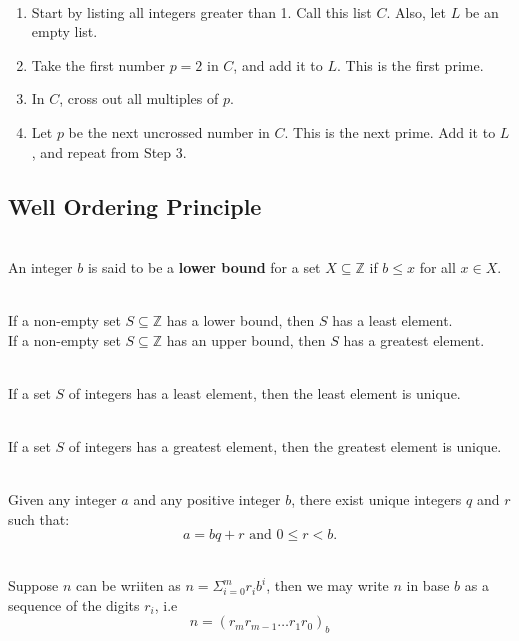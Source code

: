 \documentclass[12pt]{article}
\begin{document}
\begin{algorithm}
\hfill\\
\normalfont
\begin{enumerate}
\item Start by listing all integers greater than 1. Call this list $C$. Also, let $L$ be
an empty list.
\item Take the first number $p = 2$ in $C$, and add it to $L$. This is the first prime.
\item In $C$, cross out all multiples of $p$.
\item Let $p$ be the next uncrossed number in $C$. This is the next prime. Add it
to $L$, and repeat from Step 3.
\end{enumerate}
\end{algorithm}
\subsection{Well Ordering Principle}
\begin{definition}[4.3.1]
\hfill\\
\normalfont An integer $b$ is said to be a \textbf{lower bound} for a set $X\subseteq\mathbb{Z}$ if $b\leq x$ for all $x\in X$.
\end{definition}
\begin{theorem}[4.3.2]
\hfill\\
\normalfont If a non-empty set $S\subseteq \mathbb{Z}$ has a lower bound, then $S$ has a least
element.\\
If a non-empty set $S\subseteq \mathbb{Z}$ has an upper bound, then $S$ has a greatest
element.
\end{theorem}
\begin{proposition}[4.3.3]
\hfill\\
\normalfont If a set $S$ of integers has a least element, then the least element is
unique.
\end{proposition}
\begin{proposition}[4.3.4]
\hfill\\
\normalfont If a set $S$ of integers has a greatest element, then the greatest element is
unique.
\end{proposition}
\begin{theorem}[4.4.1]
\hfill\\
\normalfont Given any integer $a$ and any positive integer $b$, there exist unique
integers $q$ and $r$ such that:
\[a = bq + r \text{ and }0 \leq r < b.\]
\end{theorem}
\begin{theorem}
\hfill\\
\normalfont Suppose $n$ can be wriiten as $n=\Sigma^{m}_{i=0}r_i b^i$, then we may write $n$ in base $b$ as a sequence of the digits $r_i$, i.e
\[n=(r_m r_{m-1}\ldots r_1 r_0)_b\]
\end{theorem}
\end{document}
